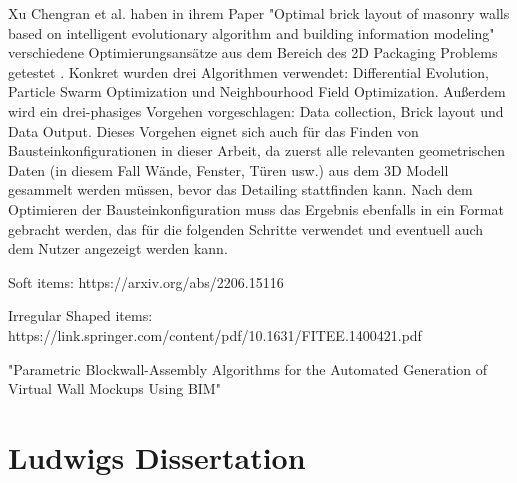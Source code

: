 Xu Chengran et al. haben in ihrem Paper "Optimal brick layout of masonry walls based on intelligent evolutionary algorithm and building information modeling" verschiedene Optimierungsansätze aus dem Bereich des 2D Packaging Problems getestet \cite{Xu2021}.
Konkret wurden drei Algorithmen verwendet: Differential Evolution, Particle Swarm Optimization und Neighbourhood Field Optimization.
Außerdem wird ein drei-phasiges Vorgehen vorgeschlagen: Data collection, Brick layout und Data Output.
Dieses Vorgehen eignet sich auch für das Finden von Bausteinkonfigurationen in dieser Arbeit, da zuerst alle relevanten geometrischen Daten (in diesem Fall Wände, Fenster, Türen usw.) aus dem 3D Modell gesammelt werden müssen, bevor das Detailing stattfinden kann.
Nach dem Optimieren der Bausteinkonfiguration muss das Ergebnis ebenfalls in ein Format gebracht werden, das für die folgenden Schritte verwendet und eventuell auch dem Nutzer angezeigt werden kann.


Soft items: https://arxiv.org/abs/2206.15116

Irregular Shaped items: https://link.springer.com/content/pdf/10.1631/FITEE.1400421.pdf

"Parametric Blockwall-Assembly Algorithms for the Automated Generation of Virtual Wall Mockups Using BIM"
\section{Ludwigs Dissertation}
\label{related:ludwigs dis}


